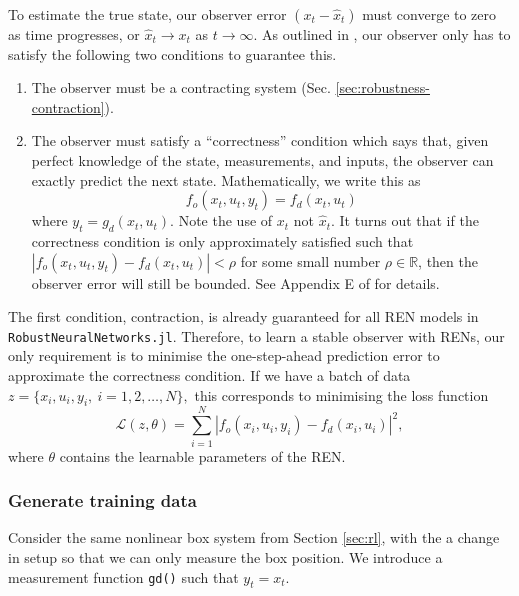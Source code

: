 To estimate the true state, our observer error $(x_t - \hat{x}_t)$ must converge to zero as time progresses, or $\hat{x}_t \rightarrow x_t$ as $t \rightarrow \infty$. As outlined in \cite{Revay++2021b}, our observer only has to satisfy the following two conditions to guarantee this.

\begin{enumerate}
    \item The observer must be a contracting system (Sec. \ref{sec:robustness-contraction}).
    \item The observer must satisfy a ``correctness'' condition which says that, given perfect knowledge of the state, measurements, and inputs, the observer can exactly predict the next state. Mathematically, we write this as
    \begin{equation}
        f_o(x_t,u_t,y_t) = f_d(x_t,u_t)
    \end{equation}
    where $y_t = g_d(x_t,u_t)$. Note the use of $x_t$ not $\hat{x}_t$. It turns out that if the correctness condition is only approximately satisfied such that $|f_o(x_t,u_t,y_t) - f_d(x_t,u_t)| < \rho$ for some small number $\rho\in\mathbb{R}$, then the observer error will still be bounded. See Appendix E of \cite{Revay++2021b} for details.
\end{enumerate}

The first condition, contraction, is already guaranteed for all REN models in \verb|RobustNeuralNetworks.jl|. Therefore, to learn a stable observer with RENs, our only requirement is to minimise the one-step-ahead prediction error to approximate the correctness condition. If we have a batch of data $z = \{x_i, u_i, y_i, \ i = 1,2,\ldots,N\},$ this corresponds to minimising the loss function
\begin{equation}
\mathcal{L}(z, \theta) = \sum_{i=1}^N |f_o(x_i,u_i,y_i) - f_d(x_i,u_i)|^2,
\end{equation}
where $\theta$ contains the learnable parameters of the REN.

\subsubsection{Generate training data} \label{sec:observer-setup}

Consider the same nonlinear box system from Section \ref{sec:rl}, with the a change in setup so that we can only measure the box position. We introduce a measurement function \verb|gd()| such that $y_t = x_t$.

